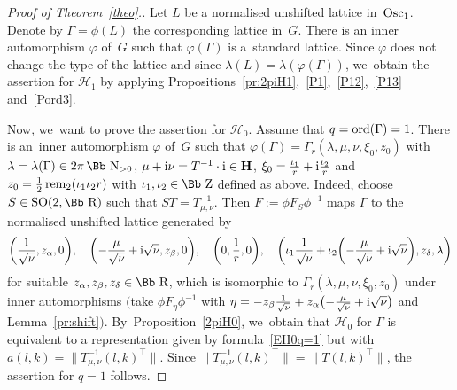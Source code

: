 \documentclass[pdftex]{sigma}
\newcommand\RR{{\mbox{\Bb R}}}
\newcommand\NN{{\mbox{\Bb N}}}
\newcommand\ZZ{{\mbox{\Bb Z}}}
\newcommand\cH{{\mathcal H}}
\newcommand\cF{{\mathcal F}}
\newcommand\ph{\varphi}
\newcommand{\SO}{\mathop{{\rm SO}}}
\newcommand{\Osc}{{\rm Osc}}
\newcommand{\rem}{\mathop{{\rm rem}}}
\newcommand{\ord}{{\rm ord}}
\numberwithin{equation}{section}
\begin{document}
\begin{proof}[Proof of Theorem~\ref{theo}.]
Let $L$ be a normalised unshifted lattice in~$\Osc_1$. Denote by $\Gamma=\phi(L)$ the corresponding lattice in~$G$.
There is an inner automorphism $\varphi$ of~$G$ such that $\varphi(\Gamma)$ is a~standard lattice. Since $\ph$ does not change the type of the lattice and
since $\lambda(L)=\lambda(\ph(\Gamma))$,
we~obtain the assertion for $\cH_1$ by applying Propositions~\ref{pr:2piH1},~\ref{P1},~\ref{P12},~\ref{P13} and~\ref{Pord3}.

Now, we~want to prove the assertion for $\cH_0$. Assume that $q=\ord(\Gamma)=1$. There is an~inner automorphism $\varphi$ of~$G$ such that $\varphi(\Gamma)=\Gamma_r(\lambda,\mu,\nu,\xi_0,z_0)$ with $\lambda=\lambda(\Gamma)\in 2\pi\,\NN_{>0}$, $\mu+{\rm i}\nu=T^{-1}\cdot {\rm i}\in\textbf{H}$, $\xi_0=\frac{\iota_1}{r}+{\rm i}\frac{\iota_2}{r}$ and $z_0=\frac{1}{2}\rem_2(\iota_1\iota_2r)$ with $\iota_1,\iota_2\in\ZZ$ defined as above.
Indeed, choose $S\in\SO(2,\RR)$ such that $ST=T_{\mu,\nu}^{-1}$. Then $F:=\phi F_{S}\phi^{-1}$ maps $\Gamma$ to the normalised unshifted lattice generated by
\begin{gather*}
\bigg(\frac 1{\sqrt\nu},z_\alpha,0\bigg),\quad
\bigg({-}\frac{\mu}{\sqrt\nu}+{\rm i}\sqrt\nu,z_\beta,0\bigg),\quad
\bigg(0,\frac{1}{r},0\bigg),\quad
\bigg(\iota_1\frac 1{\sqrt\nu}+\iota_2\bigg({-}\frac{\mu}{\sqrt\nu}+{\rm i}\sqrt\nu\bigg),z_\delta,\lambda\bigg)
\end{gather*}
for suitable $z_\alpha,z_\beta,z_\delta\in\RR$, which is isomorphic to $\Gamma_r(\lambda,\mu,\nu,\xi_0,z_0)$ under inner automorphisms $\big($take $\phi F_\eta\phi^{-1}$ with $\eta=-z_\beta\frac 1{\sqrt\nu}+z_\alpha\big({-}\frac{\mu}{\sqrt\nu}+{\rm i}\sqrt\nu\big)$ and Lemma~\ref{pr:shift}$\big)$. By~Proposition~\ref{2piH0}, we~ob\-tain that $\cH_0$ for $\Gamma$ is equivalent to a representation given by formula~\eqref{EH0q=1} but with $a(l,k)=\big\|T_{\mu,\nu}^{-1}(l,k)^\top\big\|$.
Since $\big\|T_{\mu,\nu}^{-1}(l,k)^\top\big\|=\big\|T(l,k)^\top\big\|$, the assertion for $q=1$ follows.


\end{proof}
\end{document}
